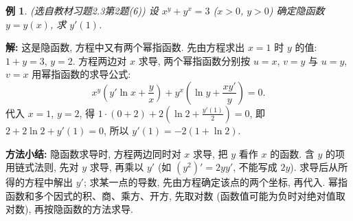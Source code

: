 \documentclass[UTF8,openany]{ctexbook}
\theoremstyle{chinesetextbook}
\newtheorem{example}{例}[section]
\newenvironment{cnsolution}{\par\indent\textbf{解:} \ignorespaces}{\par}
\begin{document}
\begin{example}\label{ex:c2-h3-2}
\textnormal{(选自教材习题2.3第2题(6))} 设 $x^y+y^x=3$ ($x>0$, $y>0$) 确定隐函数 $y=y(x)$, 求 $y'(1)$.
\end{example}
\begin{cnsolution}
这是隐函数, 方程中又有两个幂指函数. 先由方程求出 $x=1$ 时 $y$ 的值: $1+y=3$, $y=2$. 方程两边对 $x$ 求导, 两个幂指函数分别按 $u=x$, $v=y$ 与 $u=y$, $v=x$ 用幂指函数的求导公式:
\[
x^y\left(y'\ln x+\frac yx\right)+y^x\left(\ln y+\frac{xy'}y\right)=0.
\]
代入 $x=1$, $y=2$, 得 $\displaystyle1\cdot(0+2)+2\left(\ln2+\frac{y'(1)}2\right)=0$, 即 $2+2\ln2+y'(1)=0$, 所以 $y'(1)=-2(1+\ln2)$.
\end{cnsolution}
\par\indent\textbf{方法小结:} 隐函数求导时, 方程两边同时对 $x$ 求导, 把 $y$ 看作 $x$ 的函数. 含 $y$ 的项用链式法则, 先对 $y$ 求导, 再乘以 $y'$ (如 $(y^2)'=2yy'$, 不能写成 $2y$). 求导后从所得的方程中解出 $y'$; 求某一点的导数, 先由方程确定该点的两个坐标, 再代入. 幂指函数和多个因式的积、商、乘方、开方, 先取对数 (函数值可能为负时对绝对值取对数), 再按隐函数的方法求导.
\end{document}
